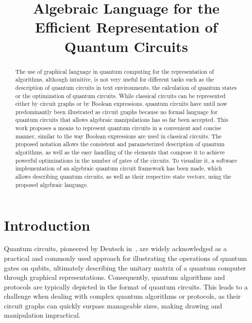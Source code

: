 \documentclass[sigconf,natbib=false]{acmart}
\begin{document}
	\title[Algebraic Language for the Efficient Representation of Quantum Circuits]{Algebraic Language for the \\ Efficient Representation of Quantum Circuits}


	\begin{abstract}
		The use of graphical language in quantum computing for the representation of algorithms, although intuitive, is not very useful for different tasks such as the description of quantum circuits in text environments, the calculation of quantum states or the optimization of quantum circuits. While classical circuits can be represented either by circuit graphs or by Boolean expressions, quantum circuits have until now predominantly been illustrated as circuit graphs because no formal language for quantum circuits that allows algebraic manipulations has so far been accepted. This work proposes a means to represent quantum circuits in a convenient and concise manner, similar to the way Boolean expressions are used in classical circuits. The proposed notation allows the consistent and parameterized description of quantum algorithms, as well as the easy handling of the elements that compose it to achieve powerful optimizations in the number of gates of the circuits. To visualize it, a software implementation of an algebraic quantum circuit framework has been made, which allows describing quantum circuits, as well as their respective state vectors, using the proposed algebraic language.
	\end{abstract}

	\maketitle

	\section{Introduction}

	Quantum circuits, pioneered by Deutsch in~\cite{Deutsch1989}, are widely acknowledged as a practical and commonly used approach for illustrating the operations of quantum gates on qubits, ultimately describing the unitary matrix of a quantum computer through graphical representations. Consequently, quantum algorithms and protocols are typically depicted in the format of quantum circuits. This leads to a challenge when dealing with complex quantum algorithms or protocols, as their circuit graphs can quickly surpass manageable sizes, making drawing and manipulation impractical.
\end{document}
